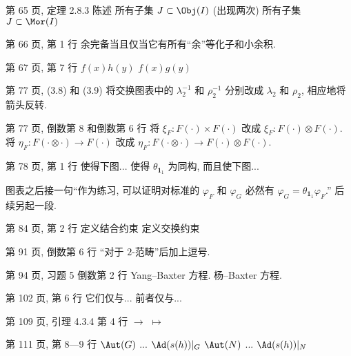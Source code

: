 \documentclass{AJerrata}
\begin{document}
\begin{Errata}
		\item[第 65 页, 定理 2.8.3 陈述]
		\Orig 所有子集 $J \subset \Obj(I)$ (出现两次)
		\Corr 所有子集 $J \subset \Mor(I)$

		\item[第 66 页, 第 1 行]
		余完备当且仅当它有所有``余''等化子和小余积.
		
		\item[第 67 页, 第 7 行]
		\Orig $f(x)h(y)$
		\Corr $f(x)g(y)$

		\item[第 77 页, (3.8) 和 (3.9)]
		将交换图表中的 $\lambda_2^{-1}$ 和 $\rho_2^{-1}$ 分别改成 $\lambda_2$ 和 $\rho_2$, 相应地将箭头反转.

		\item[第 77 页, 倒数第 8 和倒数第 6 行]
		将 $\xi_F: F(\cdot) \times F(\cdot)$ 改成 $\xi_F: F(\cdot) \otimes F(\cdot)$. 将 $\eta_F: F(\cdot \otimes \cdot) \to F(\cdot)$ 改成 $\eta_F: F(\cdot \otimes \cdot) \to F(\cdot) \otimes F(\cdot)$.
		
		\item[第 78 页, 第 1 行]
		\Orig 使得下图...
		\Corr 使得 $\theta_{\mathbf{1}_1}$ 为同构, 而且使下图...
		
		图表之后接一句``作为练习, 可以证明对标准的 $\varphi_F$ 和 $\varphi_G$ 必然有 $\varphi_G = \theta_{\mathbf{1}_1} \varphi_F$.''  后续另起一段.
		
		\item[第 84 页, 第 2 行]
		\Orig 定义结合约束
		\Corr 定义交换约束

		\item[第 91 页, 倒数第 6 行]
		``对于 $2$-范畴''后加上逗号.

        \item[第 94 页, 习题 5 倒数第 2 行]
        \Orig Yang--Baxter 方程.
        \Corr 杨--Baxter 方程.
        
       	\item[第 102 页, 第 6 行]
        \Orig 它们仅与...
        \Corr 前者仅与...
        
        \item[第 109 页, 引理 4.3.4 第 4 行]
        \Orig $\longrightarrow$
        \Corr $\longmapsto$
        
        \item[第 111 页, 第 8---9 行]
        \Orig $\Aut(G)$ ... $\Ad(s(h))|_G$
        \Corr $\Aut(N)$ ... $\Ad(s(h))|_N$
        

\end{Errata}
\end{document}
